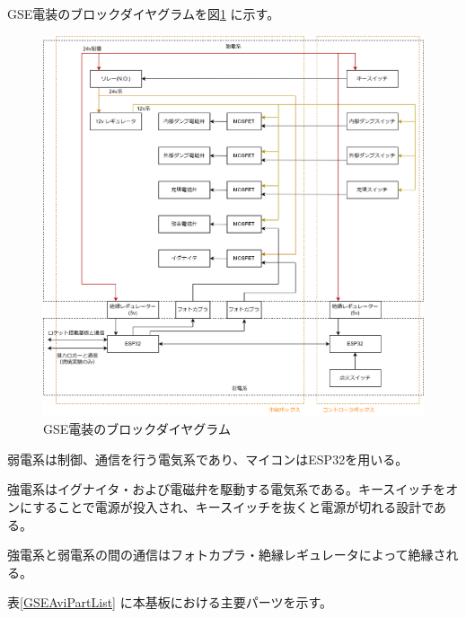 \documentclass[dvipdfmx,a4j]{jsarticle}
\begin{document}
GSE電装のブロックダイヤグラムを図\ref{GSEAviChart} に示す。

\begin{figure}[htbp]
    \centering
    \includegraphics[width = 15cm]{figures/GSEAviChart.drawio.png}
    \caption{GSE電装のブロックダイヤグラム}
    \label{GSEAviChart}
\end{figure}

弱電系は制御、通信を行う電気系であり、マイコンはESP32を用いる。

強電系はイグナイタ・および電磁弁を駆動する電気系である。キースイッチをオンにすることで電源が投入され、キースイッチを抜くと電源が切れる設計である。

強電系と弱電系の間の通信はフォトカプラ・絶縁レギュレータによって絶縁される。

表\ref{GSEAviPartList} に本基板における主要パーツを示す。
\end{document}
